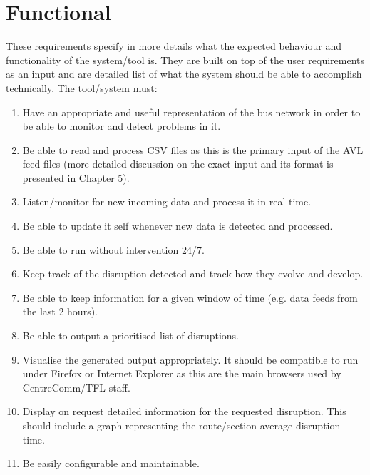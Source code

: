 \section{Functional}
These requirements specify in more details what the expected behaviour and functionality of the system/tool is. They are built on top of the user requirements as an input and are detailed list of what the system should be able to accomplish technically. The tool/system must:
\begin{enumerate}
	\item Have an appropriate and useful representation of the bus network in order to be able to monitor and detect problems in it.
	\item Be able to read and process CSV files as this is the primary input of the AVL feed files (more detailed discussion on the exact input and its format is presented in Chapter 5).
	\item Listen/monitor for new incoming data and process it in real-time.
	\item Be able to update it self whenever new data is detected and processed.
	\item Be able to run without intervention 24/7.
	\item Keep track of the disruption detected and track how they evolve and develop.
	\item Be able to keep information for a given window of time (e.g. data feeds from the last 2 hours).
	\item Be able to output a prioritised list of disruptions.
	\item Visualise the generated output appropriately. It should be compatible to run under Firefox or Internet Explorer as this are the main browsers used by CentreComm/TFL staff.
	\item Display on request detailed information for the requested disruption. This should include a graph representing the route/section average disruption time.
	\item Be easily configurable and maintainable.
\end{enumerate}